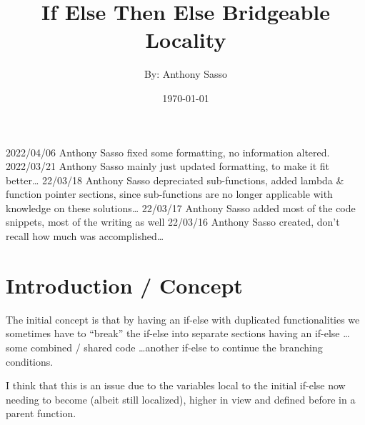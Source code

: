 \documentclass{article}
\title          {\Huge If Else Then Else Bridgeable Locality}
\author         {By: Anthony Sasso}
\date           {\today}
\newcommand{\clfootnote}[3]{\color{#2}{\footnote{\label{#1}{ \color{#2}{#3}}}}\color{defaultcolor}}
\begin{document}
    
    \maketitle

    \begin{versionhistory}
         {2022/04/06}    {Anthony Sasso} {fixed some formatting, no information altered.}
           {2022/03/21}    {Anthony Sasso} {mainly just updated formatting, to make it fit better\dots}
           {22/03/18}      {Anthony Sasso} {depreciated sub-functions, added lambda \& function pointer sections, since sub-functions are no longer applicable with knowledge on these solutions\dots}
             {22/03/17}      {Anthony Sasso} {added most of the code snippets, most of the writing as well}
           {22/03/16}      {Anthony Sasso} {created, don't recall how much was accomplished\dots}
    \end{versionhistory}

    \tableofcontents

    \newpage
    \section{Introduction / Concept}
        The initial concept is that by having an if-else with duplicated functionalities we sometimes have to ``break'' the if-else into separate sections having an if-else \dots some combined / shared code \dots another if-else to continue the branching conditions.

    \bigskip
        I think that this is an issue due to the variables local to the initial if-else now needing to become (albeit still localized), higher in view and defined before in a parent function\clfootnote{IntroClarificationNote}{blue}{which may not be wanted \& can cause issues as shown in the listed examples}.
\end{document}
